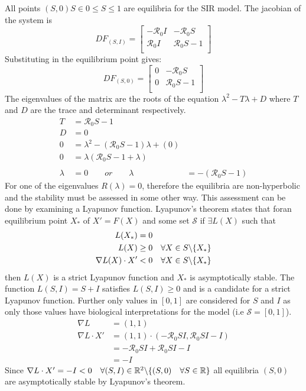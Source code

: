 All points $(S,0) S \in 0 \leq S \leq 1$ are equilibria for the SIR model.
The jacobian of the system is
$$ DF_{(S,I)} =
\begin{bmatrix}
    -{\mathcal R_0}I & -{\mathcal R_0}S\\
     {\mathcal R_0}I &  {\mathcal R_0}S - 1\\
\end{bmatrix} $$
Substituting in the equilibrium point gives:
$$ DF_{(S,0)} =
\begin{bmatrix}
    0 & -{\mathcal R_0}S\\
    0 &  {\mathcal R_0}S - 1\\
\end{bmatrix} $$
The eigenvalues of the matrix are the roots of the equation $\lambda^2 - T\lambda + D$ where $T$ and $D$ are the trace and determinant respectively.
\begin{align*}
    T &= {\mathcal R_0}S - 1\\
    D &= 0\\
    0 &= \lambda^2 - ({\mathcal R_0}S - 1)\lambda + (0)\\
    0 &= \lambda({\mathcal R_0}S - 1 + \lambda)\\\\
    \lambda &= 0\qquad or\qquad \lambda &= -({\mathcal R_0}S - 1)
\end{align*}
For one of the eigenvalues $R(\lambda) = 0$, therefore the equilibria are non-hyperbolic and the stability must be assessed in some other way.
This assessment can be done by examining a Lyapunov function.
Lyapunov's theorem states that foran equilibrium point $X_*$ of $X'=F(X)$ and some set ${\mathcal S}$ if $\exists L(X)$ such that
\begin{align*}
    L(X_*) &= 0\\
    L(X) &\geq 0\quad \forall X \in S\char`\\ \{X_*\}\\
    \nabla L(X) \cdot X' &< 0 \quad \forall X \in S\char`\\ \{X_*\}
\end{align*}
then $L(X)$ is a strict Lyapunov function and $X_*$ is asymptotically stable.
The function $L(S,I) = S + I$ satisfies $L(S,I) \geq 0$ and is a candidate for a strict Lyapunov function.
Further only values in $[0,1]$ are considered for $S$ and $I$ as only those values have biological interpretations for the model (i.e ${\mathcal S} = [0,1]$).
\begin{align*}
    \nabla L &= (1,1)\\
    \nabla L \cdot X' &= (1,1)\cdot(-{\mathcal R_0}SI,{\mathcal R_0}SI-I)\\
    &=-{\mathcal R_0}SI + {\mathcal R_0}SI-I\\
    &=-I
\end{align*}
Since $\nabla L \cdot X' = -I < 0\quad \forall (S,I) \in \mathbb{R}^2\char`\\ \{(S,0)\quad \forall S \in \mathbb{R}\}$ all equilibria $(S,0)$ are asymptotically stable by Lyapunov's theorem.
